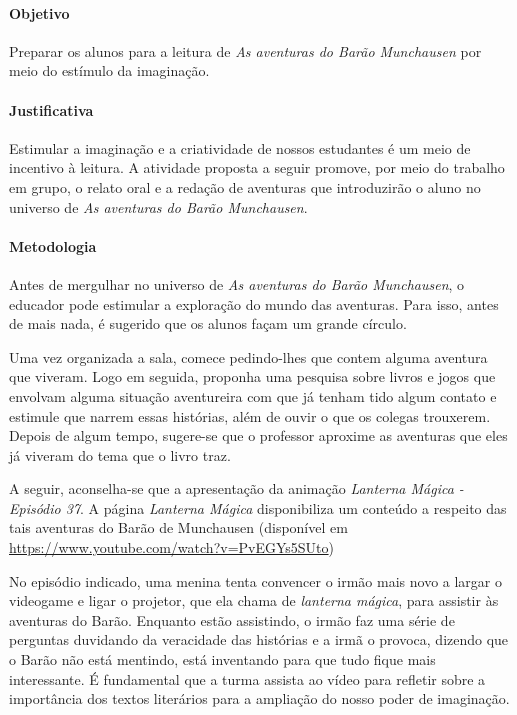 \documentclass[11pt]{extarticle}
\begin{document}
\paragraph{Objetivo} Preparar os alunos para a leitura de \textit{As aventuras do Barão Munchausen} por meio do estímulo da imaginação.

\paragraph{Justificativa} Estimular a imaginação e a criatividade de nossos estudantes é um meio de incentivo à leitura. A atividade proposta a seguir promove, por meio do trabalho em grupo, o relato oral e a redação de aventuras que introduzirão o aluno no universo de \textit{As aventuras do Barão Munchausen}.    

\paragraph{Metodologia} Antes de mergulhar no universo de \textit{As aventuras do Barão Munchausen}, o educador pode estimular a exploração do mundo das aventuras. Para isso, antes de mais nada, é sugerido que os alunos façam um grande círculo. 

Uma vez organizada a sala, comece pedindo-lhes que contem alguma aventura que viveram. Logo em seguida, proponha uma pesquisa sobre livros e jogos que envolvam alguma situação aventureira com que já tenham tido algum contato e estimule que narrem essas histórias, além de ouvir o que os colegas trouxerem. Depois de algum tempo, sugere-se que o professor aproxime as aventuras que eles já viveram do tema que o livro traz. 

A seguir, aconselha-se que a apresentação da animação \textit{Lanterna Mágica - Episódio 37}. A página \textit{Lanterna Mágica} disponibiliza um conteúdo a respeito das tais aventuras do Barão de Munchausen (disponível em \url{https://www.youtube.com/watch?v=PvEGYs5SUto})


No episódio indicado, uma menina tenta convencer o irmão mais novo a largar o videogame e ligar o projetor, que ela chama de \textit{lanterna mágica}, para assistir às aventuras do Barão. Enquanto estão assistindo, o irmão faz uma série de perguntas duvidando da veracidade das histórias e a irmã o provoca, dizendo que o Barão não está mentindo, está inventando para que tudo fique mais interessante. É fundamental que a turma assista ao vídeo para refletir sobre a importância dos textos literários para a ampliação do nosso poder de imaginação. 
\end{document}

